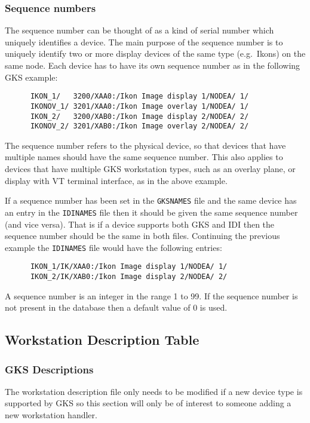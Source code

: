 \subsubsection{Sequence numbers}

The sequence number can be thought of as a kind of serial number which
uniquely identifies a device. The main purpose of the sequence number
is to uniquely identify two or more display devices of the same type
(e.g.~Ikons) on the same node. Each device has to have its own sequence
number as in the following GKS example:
\begin{verbatim}
      IKON_1/   3200/XAA0:/Ikon Image display 1/NODEA/ 1/
      IKONOV_1/ 3201/XAA0:/Ikon Image overlay 1/NODEA/ 1/ 
      IKON_2/   3200/XAB0:/Ikon Image display 2/NODEA/ 2/
      IKONOV_2/ 3201/XAB0:/Ikon Image overlay 2/NODEA/ 2/
\end{verbatim}
The sequence number refers to the physical device, so that devices that
have multiple names should have the same sequence number. This also
applies to devices that have multiple GKS workstation types, such as an
overlay plane, or display with VT terminal interface, as in the above
example.

If a sequence number has been set in the {\tt GKSNAMES} file and the same
device has an entry in the {\tt IDINAMES} file then it should be given
the same sequence number (and vice versa). That is if a device supports
both GKS and IDI then the sequence number should be the same in both files.
Continuing the previous example the {\tt IDINAMES} file would have
the following entries:
\begin{verbatim}
      IKON_1/IK/XAA0:/Ikon Image display 1/NODEA/ 1/
      IKON_2/IK/XAB0:/Ikon Image display 2/NODEA/ 2/
\end{verbatim}

A sequence number is an integer in the range 1 to 99. If the sequence number
is not present in the database then a default value of 0 is used.

\subsection{Workstation Description Table}\label{wdt}

\subsubsection{GKS Descriptions}

The workstation description file only needs to be modified if a new device type
is supported by GKS so this section will only be of interest to someone adding
a new workstation handler.

